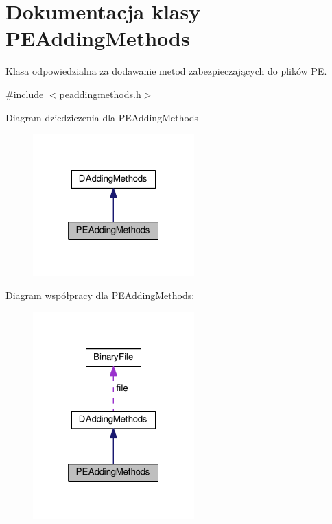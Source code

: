 \hypertarget{class_p_e_adding_methods}{\section{Dokumentacja klasy P\-E\-Adding\-Methods}
\label{class_p_e_adding_methods}
}


Klasa odpowiedzialna za dodawanie metod zabezpieczających do plików P\-E.  




{\ttfamily \#include $<$peaddingmethods.\-h$>$}



Diagram dziedziczenia dla P\-E\-Adding\-Methods
\nopagebreak
\begin{figure}[H]
\begin{center}
\leavevmode
\includegraphics[width=176pt]{class_p_e_adding_methods__inherit__graph}
\end{center}
\end{figure}


Diagram współpracy dla P\-E\-Adding\-Methods\-:
\nopagebreak
\begin{figure}[H]
\begin{center}
\leavevmode
\includegraphics[width=176pt]{class_p_e_adding_methods__coll__graph}
\end{center}
\end{figure}
